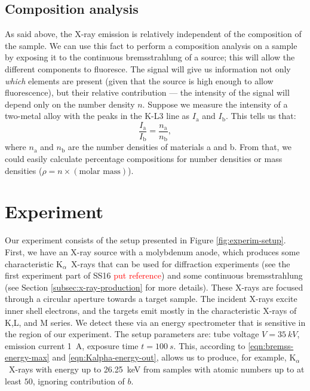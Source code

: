 \documentclass[11pt,a4paper,twoside,onecolumn]{article}
\newcommand{\reminder}[1]{\textcolor{red}{#1}}
\newcommand{\Kalpha}{$\mathrm{K}_\alpha$~}
\begin{document}
\subsection{Composition analysis}
As said above, the X-ray emission is relatively independent of the composition of the sample. We can use this fact to perform a composition analysis on a sample by exposing it to the continuous bremsstrahlung of a source; this will allow the different components to fluoresce. The signal will give us information not only \emph{which} elements are present (given that the source is high enough to allow fluorescence), but their relative contribution --- the intensity of the signal will depend only on the number density $n$. Suppose we measure the intensity of a two-metal alloy with the peaks in the K-L3 line as $I_\mathrm{a}$ and $I_\mathrm{b}$.
This tells us that:
\begin{equation}
    \frac{I_\mathrm{a}}{I_\mathrm{b}} = \frac{n_\mathrm{a}}{n_\mathrm{b}},
\end{equation}
where $n_\mathrm{a}$ and $n_\mathrm{b}$ are the number densities of materials a and b. From that, we could easily calculate percentage compositions for number densities or mass densities ($\rho = n \times (\text{molar mass})$).

\section{Experiment}\label{sec:experiment}
Our experiment consists of the setup presented in Figure \ref{fig:experim-setup}. First, we have an X-ray source with a molybdenum anode, which produces some characteristic \Kalpha X-rays that can be used for diffraction experiments (see the first experiment part of SS16 \reminder{put reference}) and some continuous bremsstrahlung (see Section \ref{subsec:x-ray-production} for more details). These X-rays are focused through a circular aperture towards a target sample. The incident X-rays excite inner shell electrons, and the targets emit mostly in the characteristic X-rays of K,L, and M series. We detect these via an energy spectrometer that is sensitive in the region of our experiment. The setup parameters are: tube voltage $V = \qty{35}{kV}$, emission current \qty{1}{A}, exposure time $t=\qty{100}{s}$. This, according to \eqref{eqn:bremss-energy-max} and \eqref{eqn:Kalpha-energy-out}, allows us to produce, for example, \Kalpha X-rays with energy up to \qty{26.25}{keV} from samples with atomic numbers up to at least $50$, ignoring contribution of $b$.
\end{document}

